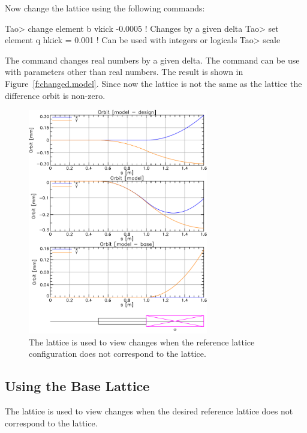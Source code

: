 \documentclass{hitec}
\begin{document}
\newpage

Now change the  lattice using the following commands:
\begin{code}
Tao> change element b vkick  -0.0005   ! Changes by a given delta
Tao> set element q hkick = 0.001       ! Can be used with integers or logicals
Tao> scale
\end{code}
The  command changes real numbers by a given delta. The  command can be use with
parameters other than real numbers.  The result is shown in Figure~\ref{f:changed.model}. Since now
the  lattice is not the same as the  lattice the difference orbit is non-zero.

\begin{figure}[b]
  \centering
  \includegraphics[width=0.7\textwidth]{with-base.pdf}
  \caption{The  lattice is used to view changes when the reference lattice configuration
does not correspond to the  lattice.}
  \label{f:base}
\end{figure}

\subsection{Using the Base Lattice}

The  lattice is used to view changes when the desired reference lattice does not
correspond to the  lattice.
\end{document}
